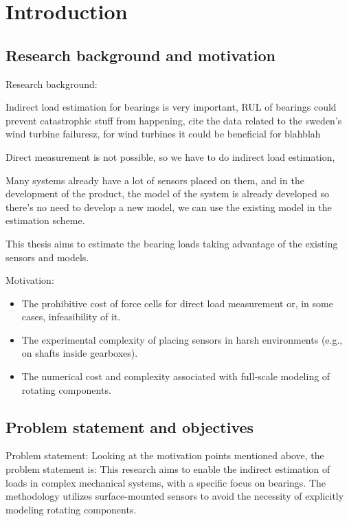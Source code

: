 \chapter{Introduction}\label{ch:introduction}

\section{Research background and motivation}

Research background:

Indirect load estimation for bearings is very important, RUL of bearings could prevent catastrophic stuff from happening, cite the data related to the sweden's wind turbine failuresz, for wind turbines it could be beneficial for blahblah

Direct measurement is not possible, so we have to do indirect load estimation,



Many systems already have a lot of sensors placed on them, and in the development of the product, the model of the system is already developed so there's no need to develop a new model, we can use the existing model in the estimation scheme.

This thesis aims to estimate the bearing loads taking advantage of the existing sensors and models.

Motivation:
\begin{itemize}
  \item The prohibitive cost of force cells for direct load measurement or, in some cases, infeasibility of it.
  \item The experimental complexity of placing sensors in harsh environments (e.g., on shafts inside gearboxes).
  \item The numerical cost and complexity associated with full-scale modeling of rotating components.
\end{itemize}



\section{Problem statement and objectives}

Problem statement:
Looking at the motivation points mentioned above, the problem statement is: This research aims to enable the indirect estimation of loads in complex mechanical systems, with a specific focus on bearings. The methodology utilizes surface-mounted sensors to avoid the necessity of explicitly modeling rotating components.


